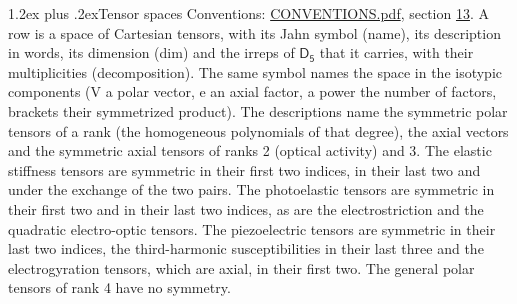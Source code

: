 \documentclass[10pt,a4paper]{article}
\makeatletter
\renewcommand\section{\@startsection{section}{1}{\z@}{-3ex plus -1ex minus -.2ex}%
  {1.2ex plus .2ex}{\normalfont\large\sffamily\bfseries\color{parttitle}}}
\numberwithin{equation}{section}
\newcommand{\grp}[1]{\mathsf{#1}}
\makeatother
\begin{document}
\section{Tensor spaces}\label{s:tensor_spaces}
Conventions: \href{../../CONVENTIONS.pdf}{CONVENTIONS.pdf}, section \href{../../CONVENTIONS.pdf\#conv.13}{13}.
\leavevmode\label{n:head.name}\label{n:head.description}\label{n:head.dim}\label{n:head.decomposition}A row is a space of Cartesian tensors, with its Jahn symbol (name), its description in words, its dimension (dim) and the irreps of $\grp{D_{5}}$ that it carries, with their multiplicities (decomposition). \label{n:label.jahn}The same symbol names the space in the isotypic components (V a polar vector, e an axial factor, a power the number of factors, brackets their symmetrized product). The descriptions name the symmetric polar tensors of a rank (the homogeneous polynomials of that degree), the axial vectors and the symmetric axial tensors of ranks 2 (optical activity) and 3. The elastic stiffness tensors are symmetric in their first two indices, in their last two and under the exchange of the two pairs. The photoelastic tensors are symmetric in their first two and in their last two indices, as are the electrostriction and the quadratic electro-optic tensors. The piezoelectric tensors are symmetric in their last two indices, the third-harmonic susceptibilities in their last three and the electrogyration tensors, which are axial, in their first two. The general polar tensors of rank 4 have no symmetry.
\end{document}
